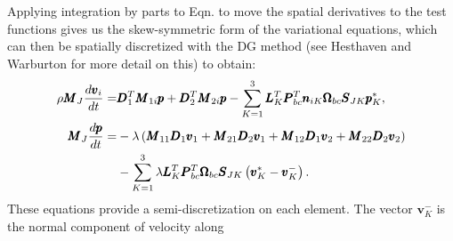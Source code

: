 Applying integration by parts to Eqn.  to move the spatial derivatives to
the test functions gives us the skew-symmetric form of the variational equations, which
can then be spatially discretized with the DG method (see Hesthaven and Warburton for more
detail on this) to obtain:
\begin{align}
  \rho \pmb{M}_{J} \frac{d \pmb{v}_{i}}{dt} =&
  \pmb{D}_{1}^{T} \pmb{M}_{1i} \pmb{p}
  + \pmb{D}_{2}^{T} \pmb{M}_{2i} \pmb{p}
  - \sum_{K=1}^{3} \pmb{L}_{K}^{T} \pmb{P}_{bc}^{T} \pmb{n}_{iK}
  \pmb{\Omega}_{bc} \pmb{S}_{JK} \pmb{p}_{K}^{*},\\
  \notag
  \pmb{M}_{J} \frac{d\pmb{p}}{dt} =&
  -\lambda\left(
  \pmb{M}_{11} \pmb{D}_{1} \pmb{v}_{1}
    +
    \pmb{M}_{21} \pmb{D}_{2} \pmb{v}_{1}
    +
    \pmb{M}_{12} \pmb{D}_{1} \pmb{v}_{2}
    +
    \pmb{M}_{22} \pmb{D}_{2} \pmb{v}_{2}
  \right)\\
  &- \sum_{K=1}^{3}\lambda \pmb{L}_{K}^{T} \pmb{P}_{bc}^{T} \pmb{\Omega}_{bc}
  \pmb{S}_{JK} \left(\pmb{v}_{K}^* - \pmb{v}_{K}^{-}\right).
\end{align}
These equations provide a semi-discretization on each element.
The vector $\pmb{v}_{K}^{-}$ is the normal component of velocity along

